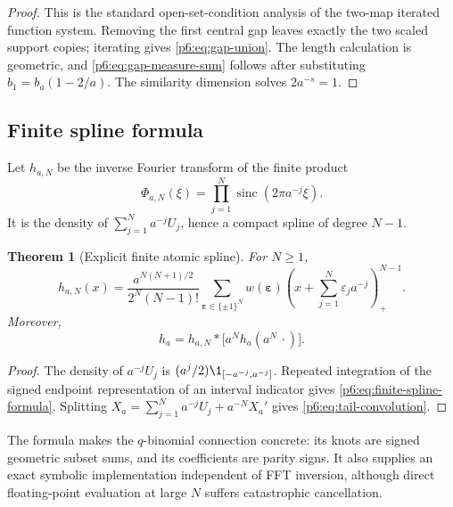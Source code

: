 \documentclass[11pt,oneside]{article}
\numberwithin{equation}{section}
\newtheorem{theorem}{Theorem}[section]
\theoremstyle{definition}
\theoremstyle{remark}
\newcommand{\sinc}{\operatorname{sinc}}
\begin{document}
\begin{proof}
This is the standard open-set-condition analysis of the two-map iterated
function system.  Removing the first central gap leaves exactly the two scaled
support copies; iterating gives \eqref{p6:eq:gap-union}.  The length calculation is
geometric, and \eqref{p6:eq:gap-measure-sum} follows after substituting
$b_1=b_a(1-2/a)$.  The similarity dimension solves
$2a^{-s}=1$.
\end{proof}

\subsection{Finite spline formula}

Let $h_{a,N}$ be the inverse Fourier transform of the finite product
\begin{equation}\label{p6:eq:Phi-a-N}
 \Phi_{a,N}(\xi)=\prod_{j=1}^{N}
 \sinc(2\pi a^{-j}\xi).
\end{equation}
It is the density of $\sum_{j=1}^{N}a^{-j}U_j$, hence a compact spline of degree
$N-1$.

\begin{theorem}[Explicit finite atomic spline]\label{p6:thm:finite-spline}
For $N\ge1$,
\begin{equation}\label{p6:eq:finite-spline-formula}
 h_{a,N}(x)=
 \frac{a^{N(N+1)/2}}{2^N(N-1)!}
 \sum_{\boldsymbol\varepsilon\in\{\pm1\}^N}
 w(\boldsymbol\varepsilon)
 \left(x+\sum_{j=1}^{N}\varepsilon_ja^{-j}\right)_+^{N-1}.
\end{equation}
Moreover,
\begin{equation}\label{p6:eq:tail-convolution}
 h_a=h_{a,N}*\bigl[a^Nh_a(a^N\,\cdot)\bigr].
\end{equation}
\end{theorem}

\begin{proof}
The density of $a^{-j}U_j$ is
$(a^j/2)\1_{[-a^{-j},a^{-j}]}$.  Repeated integration of the signed endpoint
representation of an interval indicator gives
\eqref{p6:eq:finite-spline-formula}.  Splitting
$X_a=\sum_{j=1}^{N}a^{-j}U_j+a^{-N}X_a'$ gives
\eqref{p6:eq:tail-convolution}.
\end{proof}

The formula makes the $q$-binomial connection concrete: its knots are signed
geometric subset sums, and its coefficients are parity signs.  It also supplies
an exact symbolic implementation independent of FFT inversion, although direct
floating-point evaluation at large $N$ suffers catastrophic cancellation.
\end{document}
